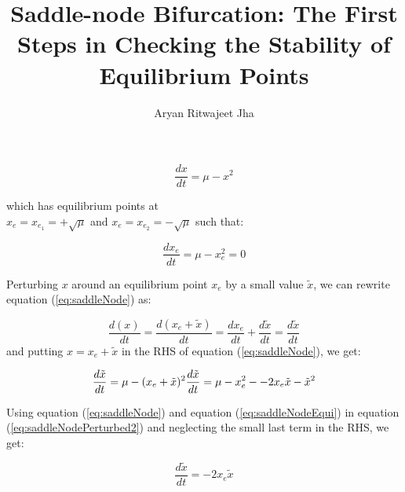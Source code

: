 \documentclass{article}
\begin{document}
	
	\title{Saddle-node Bifurcation: The First Steps in Checking the Stability of Equilibrium Points}
	\author{Aryan Ritwajeet Jha}
	\maketitle
	
	\begin{equation}
		\label{eq:saddleNode}
		\frac{dx}{dt} = \mu - x^2
	\end{equation}
	
	which has equilibrium points at\\ 
	$x_e = x_{e_1} = +\sqrt\mu$ and $x_e = x_{e_2} = -\sqrt\mu$ such that:
	
	\begin{equation}
		\label{eq:saddleNodeEqui}
		\frac{dx_e}{dt} = \mu - x_e^2 = 0 
	\end{equation}
	
	
	Perturbing $x$ around an equilibrium point $x_e$ by a small value $\tilde x$, we can rewrite equation (\ref{eq:saddleNode}) as:
	
	\begin{equation}
		\label{eq:saddleNodePerturbed}
		\frac{d(x)}{dt} = \frac{d(x_e + \tilde x)}{dt} =\frac{dx_e}{dt} + \frac{d \tilde x}{dt} = \frac{d \tilde x}{dt} 
	\end{equation}
	and putting $x = x_e + \tilde x$ in the RHS of equation (\ref{eq:saddleNode}), we get:
	
	\begin{equation}
		\label{eq:saddleNodePerturbed2}
		\frac{d\tilde x}{dt} = \mu - (x_e+\tilde x)^2 \\
		\frac{d\tilde x}{dt} = \mu - x_e^2 - -2x_e\tilde x - \tilde x^2
	\end{equation}
	
	Using equation (\ref{eq:saddleNode}) and equation (\ref{eq:saddleNodeEqui}) in equation (\ref{eq:saddleNodePerturbed2}) and neglecting the small last term in the RHS, we get:
	
	\begin{equation}
		\frac{d\tilde x}{dt} = -2x_e\tilde x
	\end{equation}
\end{document}
